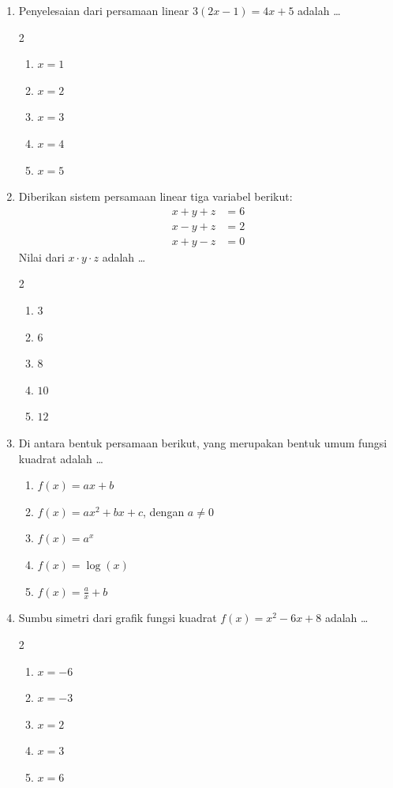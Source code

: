 \documentclass[12pt,a4paper]{article}
\begin{document}
\begin{enumerate}[itemsep=2ex]
    \item Penyelesaian dari persamaan linear $3(2x - 1) = 4x + 5$ adalah \dots
    \begin{multicols}{2}
    \begin{enumerate}[label=\Alph*.]
        \item $x = 1$
        \item $x = 2$
        \item $x = 3$
        \item $x = 4$
        \item $x = 5$
    \end{enumerate}
    \end{multicols}

    \item Diberikan sistem persamaan linear tiga variabel berikut:
    \begin{align*}
        x + y + z &= 6 \\
        x - y + z &= 2 \\
        x + y - z &= 0
    \end{align*}
    Nilai dari $x \cdot y \cdot z$ adalah \dots
    \begin{multicols}{2}
    \begin{enumerate}[label=\Alph*.]
        \item $3$
        \item $6$
        \item $8$
        \item $10$
        \item $12$
    \end{enumerate}
    \end{multicols}

    \item Di antara bentuk persamaan berikut, yang merupakan bentuk umum fungsi kuadrat adalah \dots
    \begin{enumerate}[label=\Alph*.]
        \item $f(x) = ax + b$
        \item $f(x) = ax^2 + bx + c$, dengan $a \neq 0$
        \item $f(x) = a^x$
        \item $f(x) = \log(x)$
        \item $f(x) = \frac{a}{x} + b$
    \end{enumerate}

    \item Sumbu simetri dari grafik fungsi kuadrat $f(x) = x^2 - 6x + 8$ adalah \dots
    \begin{multicols}{2}
    \begin{enumerate}[label=\Alph*.]
        \item $x = -6$
        \item $x = -3$
        \item $x = 2$
        \item $x = 3$
        \item $x = 6$
    \end{enumerate}
    \end{multicols}


\end{enumerate}
\end{document}
